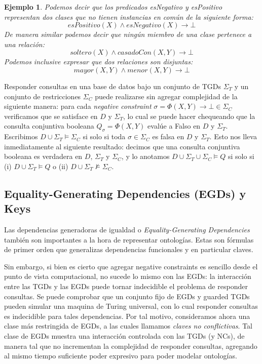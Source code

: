 \documentclass[11pt,a4paper,twoside]{tesis}
\newtheorem{exmp}{Ejemplo}
\begin{document}
\begin{exmp}
Podemos decir que los predicados esNegativo y esPositivo representan dos clases que no tienen instancias en común de la siguiente forma: $$esPositivo(X) \land esNegativo(X) \rightarrow \bot$$
De manera similar podemos decir que ningún miembro de una clase pertenece a una relación:$$soltero(X) \land casadoCon(X, Y) \rightarrow \bot $$ Podemos inclusive expresar que dos relaciones son disjuntas: $$mayor(X,Y) \land menor(X, Y) \rightarrow \bot$$
\end{exmp}

Responder consultas en una base de datos bajo un conjunto de TGDs $\Sigma_T$ y un conjunto de restricciones $\Sigma_C$ puede realizarse sin agregar complejidad de la siguiente manera: para cada \textit{negative constraint} $\sigma = \Phi(X,Y) \rightarrow \bot \in \Sigma_C$ verificamos que se satisface en $D$ y $\Sigma_T$, lo cual se puede hacer chequeando que la consulta conjuntiva booleana $Q_\sigma = \Phi(X, Y)$ evalúe a Falso en $D$ y $\Sigma_T$. Escribimos $D \cup \Sigma_T \models \Sigma_C$ si solo si toda $\sigma \in \Sigma_C$ es falsa en $D$ y $\Sigma_T$. Esto nos lleva inmediatamente al siguiente resultado: decimos que una consulta conjuntiva booleana es verdadera en $D$, $\Sigma_T$ y $\Sigma_C$, y lo anotamos $D \cup \Sigma_T \cup  \Sigma_C \models Q$ si solo si (i) $D \cup \Sigma_T \models Q$ o (ii) $D \cup \Sigma_T \not\models \Sigma_C$.

\subsection{Equality-Generating Dependencies (EGDs) y Keys}
Las dependencias generadoras de igualdad o \textit{Equality-Generating Dependencies} también son importantes a la hora de representar ontologías. Estas son fórmulas de primer orden que generalizas dependencias funcionales y en particular claves.

Sin embargo, si bien es cierto que agregar negative constraints es sencillo desde el punto de vista computacional, no sucede lo mismo con las EGDs: la interacción entre las TGDs y las EGDs puede tornar indecidible el problema de responder consultas\cite{Johnson}. Se puede comprobar que un conjunto fijo de EGDs y guarded TGDs pueden simular una maquina de Turing universal, con lo cual responder consultas es indecidible para tales dependencias. Por tal motivo, consideramos ahora una clase más restringida de EGDs, a las cuales llamamos \textit{claves no conflictivas}. Tal clase de EGDs muestra una interacción controlada con las TGDs (y NCs), de manera tal que no incrementan la complejidad de responder consultas, agregando al mismo tiempo suficiente poder expresivo para poder modelar ontologías.
\end{document}
